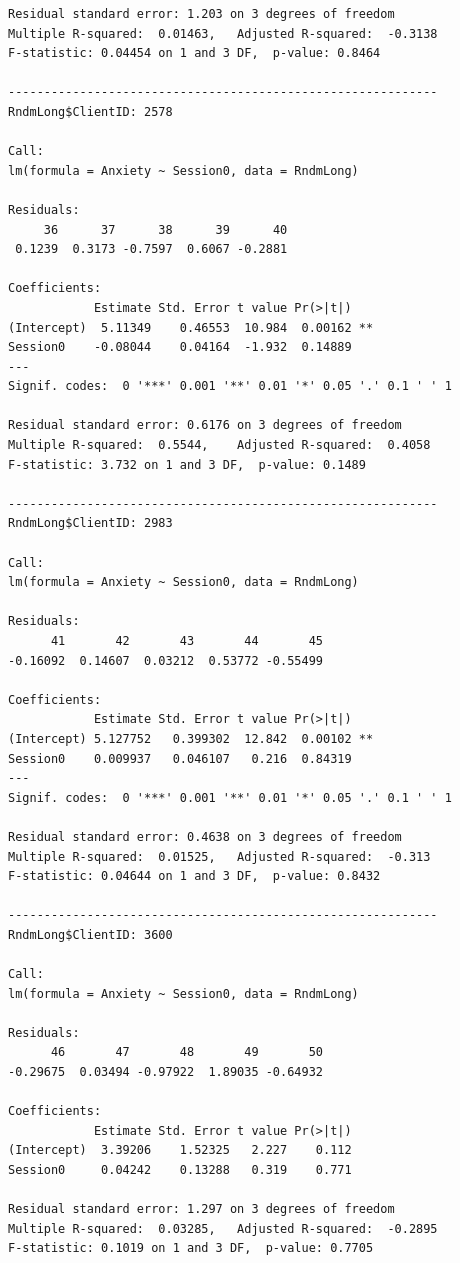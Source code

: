 \documentclass[
  english,
]{book}
\begin{document}
\begin{verbatim}
Residual standard error: 1.203 on 3 degrees of freedom
Multiple R-squared:  0.01463,   Adjusted R-squared:  -0.3138 
F-statistic: 0.04454 on 1 and 3 DF,  p-value: 0.8464

------------------------------------------------------------ 
RndmLong$ClientID: 2578

Call:
lm(formula = Anxiety ~ Session0, data = RndmLong)

Residuals:
     36      37      38      39      40 
 0.1239  0.3173 -0.7597  0.6067 -0.2881 

Coefficients:
            Estimate Std. Error t value Pr(>|t|)   
(Intercept)  5.11349    0.46553  10.984  0.00162 **
Session0    -0.08044    0.04164  -1.932  0.14889   
---
Signif. codes:  0 '***' 0.001 '**' 0.01 '*' 0.05 '.' 0.1 ' ' 1

Residual standard error: 0.6176 on 3 degrees of freedom
Multiple R-squared:  0.5544,    Adjusted R-squared:  0.4058 
F-statistic: 3.732 on 1 and 3 DF,  p-value: 0.1489

------------------------------------------------------------ 
RndmLong$ClientID: 2983

Call:
lm(formula = Anxiety ~ Session0, data = RndmLong)

Residuals:
      41       42       43       44       45 
-0.16092  0.14607  0.03212  0.53772 -0.55499 

Coefficients:
            Estimate Std. Error t value Pr(>|t|)   
(Intercept) 5.127752   0.399302  12.842  0.00102 **
Session0    0.009937   0.046107   0.216  0.84319   
---
Signif. codes:  0 '***' 0.001 '**' 0.01 '*' 0.05 '.' 0.1 ' ' 1

Residual standard error: 0.4638 on 3 degrees of freedom
Multiple R-squared:  0.01525,   Adjusted R-squared:  -0.313 
F-statistic: 0.04644 on 1 and 3 DF,  p-value: 0.8432

------------------------------------------------------------ 
RndmLong$ClientID: 3600

Call:
lm(formula = Anxiety ~ Session0, data = RndmLong)

Residuals:
      46       47       48       49       50 
-0.29675  0.03494 -0.97922  1.89035 -0.64932 

Coefficients:
            Estimate Std. Error t value Pr(>|t|)
(Intercept)  3.39206    1.52325   2.227    0.112
Session0     0.04242    0.13288   0.319    0.771

Residual standard error: 1.297 on 3 degrees of freedom
Multiple R-squared:  0.03285,   Adjusted R-squared:  -0.2895 
F-statistic: 0.1019 on 1 and 3 DF,  p-value: 0.7705


\end{verbatim}
\end{document}

